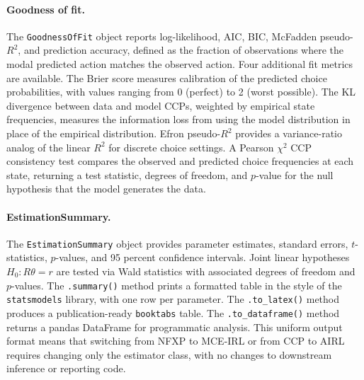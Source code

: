 \paragraph{Goodness of fit.}
The \texttt{GoodnessOfFit} object reports log-likelihood, AIC, BIC, McFadden pseudo-$R^2$, and prediction accuracy, defined as the fraction of observations where the modal predicted action matches the observed action.
Four additional fit metrics are available.
The Brier score measures calibration of the predicted choice probabilities, with values ranging from 0 (perfect) to 2 (worst possible).
The KL divergence between data and model CCPs, weighted by empirical state frequencies, measures the information loss from using the model distribution in place of the empirical distribution.
Efron pseudo-$R^2$ provides a variance-ratio analog of the linear $R^2$ for discrete choice settings.
A Pearson $\chi^2$ CCP consistency test compares the observed and predicted choice frequencies at each state, returning a test statistic, degrees of freedom, and $p$-value for the null hypothesis that the model generates the data.

\paragraph{EstimationSummary.}
The \texttt{EstimationSummary} object provides parameter estimates, standard errors, $t$-statistics, $p$-values, and 95 percent confidence intervals.
Joint linear hypotheses $H_0\!: R\theta = r$ are tested via Wald statistics with associated degrees of freedom and $p$-values.
The \texttt{.summary()} method prints a formatted table in the style of the \texttt{statsmodels} library, with one row per parameter.
The \texttt{.to\_latex()} method produces a publication-ready \texttt{booktabs} table.
The \texttt{.to\_dataframe()} method returns a pandas DataFrame for programmatic analysis.
This uniform output format means that switching from NFXP to MCE-IRL or from CCP to AIRL requires changing only the estimator class, with no changes to downstream inference or reporting code.

